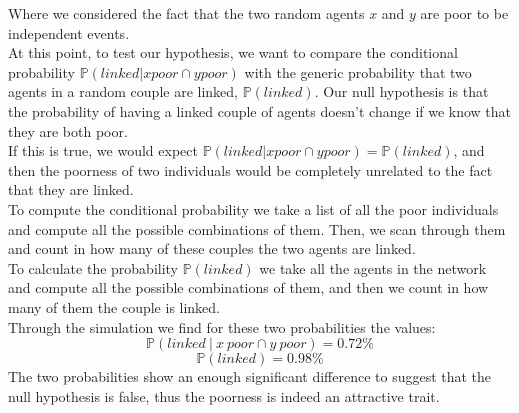 Where we considered the fact that the two random agents $x$ and $y$ are poor to be independent events. \\
At this point, to test our hypothesis, we want to compare the conditional probability $\mathbb{P}(linked \vert x poor \cap y poor)$ with the generic probability that two agents in a random couple are linked, $\mathbb{P}(linked)$.
Our null hypothesis is that the probability of having a linked couple of agents doesn't change if we know that they are both poor. \\
If this is true, we would expect $\mathbb{P}(linked \vert x poor \cap y poor) = \mathbb{P}(linked)$, and then the poorness of two individuals would be completely unrelated to the fact that they are linked. \\
To compute the conditional probability we take a list of all the poor individuals and compute all the possible combinations of them.
Then, we scan through them and count in how many of these couples the two agents are linked. \\
To calculate the probability $\mathbb{P}(linked)$ we take all the agents in the network and compute all the possible combinations of them, and then we count in how many of them the couple is linked. \\
Through the simulation we find for these two probabilities the values:
\begin{equation*}
	\mathbb{P}(linked \ \vert \ x \ poor \cap y \ poor) = 0.72\%
\end{equation*}
\begin{equation*}
	\mathbb{P}(linked) = 0.98\%
\end{equation*}
The two probabilities show an enough significant difference to suggest that the null hypothesis is false, thus the poorness is indeed an attractive trait.

